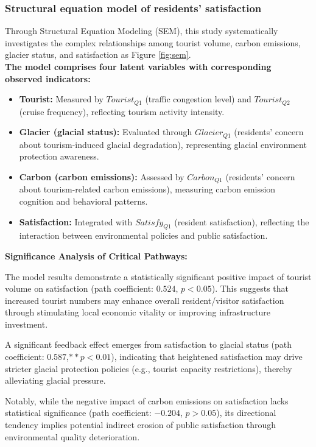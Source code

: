 \documentclass{mcmthesis}
\begin{document}
\subsubsection{Structural equation model of residents' satisfaction}
Through Structural Equation Modeling (SEM), this study systematically investigates the complex relationships among tourist volume, carbon emissions, glacier status, and satisfaction as Figure \ref{fig:sem}.\\ 
\textbf{The model comprises four latent variables with corresponding observed indicators:}
\begin{itemize}
  \item \textbf{Tourist:} Measured by $Tourist_{Q1}$ (traffic congestion level) and $Tourist_{Q2}$ (cruise frequency), reflecting tourism activity intensity. 
  \item \textbf{Glacier (glacial status):} Evaluated through $Glacier_{Q1}$ (residents' concern about tourism-induced glacial degradation), representing glacial environment protection awareness.
  \item \textbf{Carbon (carbon emissions): } Assessed by $Carbon_{Q1}$ (residents' concern about tourism-related carbon emissions), measuring carbon emission cognition and behavioral patterns.
  \item \textbf{Satisfaction:} Integrated with $Satisfy_{Q1}$ (resident satisfaction), reflecting the interaction between environmental policies and public satisfaction.
\end{itemize}
\textbf{Significance Analysis of Critical Pathways:}\par
The model results demonstrate a statistically significant positive impact of tourist volume on satisfaction (path coefficient: $0.524$, $p < 0.05$). This suggests that increased tourist numbers may enhance overall resident/visitor satisfaction through stimulating local economic vitality or improving infrastructure investment.\par
A significant feedback effect emerges from satisfaction to glacial status (path coefficient: $0.587$,$ **p < 0.01$), indicating that heightened satisfaction may drive stricter glacial protection policies (e.g., tourist capacity restrictions), thereby alleviating glacial pressure.\par
Notably, while the negative impact of carbon emissions on satisfaction lacks statistical significance (path coefficient: $-0.204$, $p > 0.05$), its directional tendency implies potential indirect erosion of public satisfaction through environmental quality deterioration.\par
\end{document}
